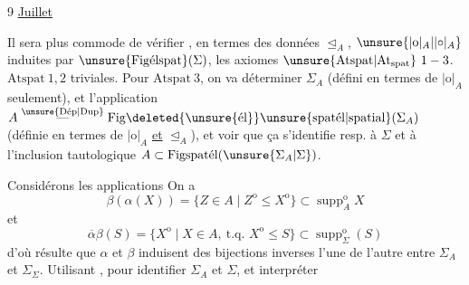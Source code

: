 
9 \uline{Juillet}

Il sera plus commode de vérifier , en termes des données $\trianglelefteq_A$, $\unsure{|\mathrm{o}|_A|\lvert\circ\rvert_A}$ induites par $\unsure{\mathrm{Fig\acute elspat}}(\Sigma)$, les axiomes $\unsure{\mathrm{Atspat}|\mathrm{At}_{\mathrm{spat}}}\ 1-3$.
$\mathrm{Atspat}\ 1,2$ triviales. Pour $\mathrm{Atspat}\ 3$, on va déterminer  $\Sigma_A$ (défini en termes de $|\mathrm{o}|_A$ seulement), et l'application
$A\overset{\unsure{\mathrm{D\acute ep}|\mathrm{Dup}}}{\mathrel{\text{---}}}\mathrm{Fig}\deleted{\unsure{\mathrm{\acute el}}}\unsure{\mathrm{spat\acute el}|\mathrm{spatial}}(\Sigma_A)$
(définie en termes de $|\mathrm{o}|_A$ \uline{et} $\trianglelefteq_A$), et voir que ça s'identifie resp. à $\Sigma$ et à l'inclusion tautologique $A\subset\mathrm{Figspat\acute el}(\unsure{\Sigma_A|\Sigma})$.

 Considérons les applications
On a
\[
\beta(\alpha(X))=\{Z\in A\mid Z^{\mathrm{o}}\leq X^{\mathrm{o}}\}\subset\operatorname{supp}^{\mathrm{o}}_A X
\]
 et
\[
\overline\alpha\beta(S)=\{X^{\mathrm{o}}\mid X\in A,\ \text{t.q. }X^{\mathrm{o}}\leq S\}\subset\operatorname{supp}^{\mathrm{o}}_\Sigma(S)
\]
d'où résulte que $\alpha$ et $\beta$ induisent des bijections inverses l'une de l'autre entre $\mathbb\Sigma_A$ et $\mathbb\Sigma_\Sigma$. Utilisant
,
pour identifier $\mathbb\Sigma_A$ et $\Sigma$, et interpréter
